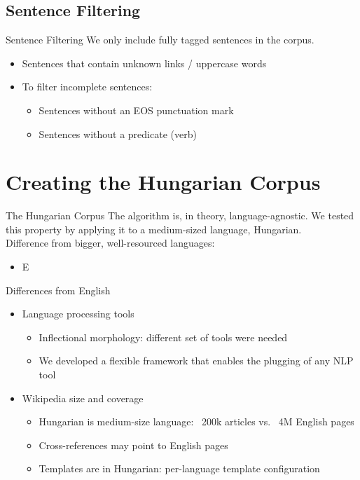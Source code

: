 \documentclass[utf8x,t]{beamer}
\newcommand{\vitem}{\vfill \item}
\begin{document}
\subsection{Sentence Filtering}
\begin{frame}{Sentence Filtering}
  We only include fully tagged sentences in the corpus.
  \begin{itemize}
  \vitem Sentences that contain unknown links / uppercase words
  \vitem To filter incomplete sentences:
    \begin{itemize}
    \vitem Sentences without an EOS punctuation mark
    \vitem Sentences without a predicate (verb)
    \end{itemize}
  \end{itemize}
  \vfill
\end{frame}

\section{Creating the Hungarian Corpus}

\begin{frame}{The Hungarian Corpus}
  The algorithm is, in theory, language-agnostic. We tested this property by
  applying it to a medium-sized language, Hungarian. \\
  Difference from bigger, well-resourced languages:
  \begin{itemize}
  \vitem E %
  \end{itemize}
\end{frame}

\begin{frame}{Differences from English}
  \begin{itemize}
  \vitem Language processing tools
    \begin{itemize}
    \vitem Inflectional morphology: different set of tools were needed 
    \vitem We developed a flexible framework that enables the plugging of any NLP tool
    \end{itemize}
  \vitem Wikipedia size and coverage
    \begin{itemize}
    \vitem Hungarian is medium-size language: ~200k articles vs. ~4M English pages
    \vitem Cross-references may point to English pages
    \vitem Templates are in Hungarian: per-language template configuration
    \end{itemize}
  \end{itemize}
\end{frame}
\end{document}
